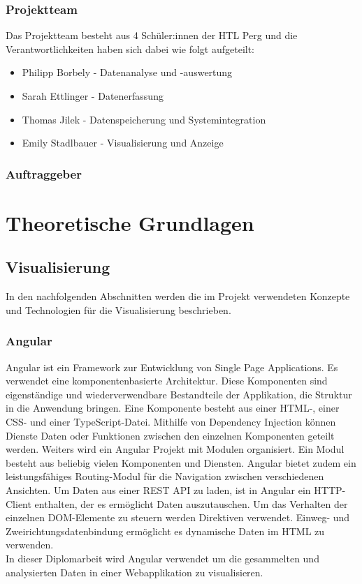 \documentclass{report}
\begin{document}
\subsection{Projektteam}
Das Projektteam besteht aus 4 Schüler:innen der HTL Perg und die Verantwortlichkeiten haben sich dabei wie folgt aufgeteilt:
\begin{itemize}
    \item Philipp Borbely - Datenanalyse und -auswertung
    \item Sarah Ettlinger - Datenerfassung
    \item Thomas Jilek - Datenspeicherung und Systemintegration
    \item Emily Stadlbauer - Visualisierung und Anzeige
\end{itemize}

\subsection{Auftraggeber}

\chapter{Theoretische Grundlagen}
\section{Visualisierung}
 In den nachfolgenden Abschnitten werden die im Projekt verwendeten Konzepte und Technologien  für die Visualisierung beschrieben.
\subsection{Angular}
Angular ist ein Framework zur Entwicklung von Single Page Applications. Es verwendet eine komponentenbasierte Architektur. Diese Komponenten sind eigenständige und wiederverwendbare Bestandteile  der Applikation, die Struktur in die Anwendung bringen. Eine Komponente besteht aus einer HTML-, einer CSS- und einer TypeScript-Datei. Mithilfe von Dependency Injection können Dienste Daten oder Funktionen  zwischen den einzelnen Komponenten geteilt werden. Weiters wird ein Angular Projekt mit Modulen organisiert. Ein Modul besteht aus beliebig vielen Komponenten und Diensten. Angular bietet zudem ein leistungsfähiges Routing-Modul für die Navigation zwischen verschiedenen Ansichten. Um Daten aus einer REST API zu laden, ist in Angular ein HTTP-Client enthalten, der es ermöglicht Daten auszutauschen. Um das Verhalten der einzelnen DOM-Elemente zu steuern werden Direktiven verwendet.
Einweg- und Zweirichtungsdatenbindung ermöglicht es dynamische Daten im HTML zu verwenden.
\\In dieser Diplomarbeit wird Angular verwendet um die gesammelten und analysierten Daten in einer Webapplikation zu visualisieren.
\end{document}
